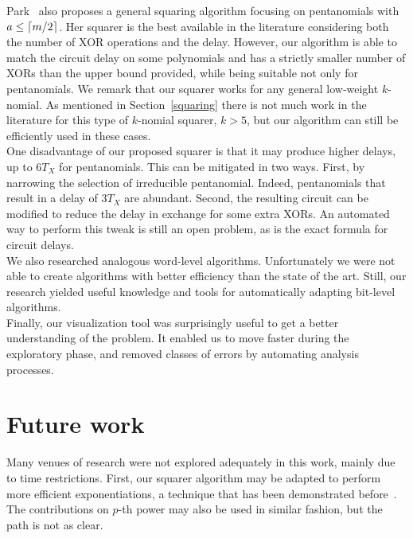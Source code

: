 Park~\cite{park2012explicit} also proposes a general squaring algorithm focusing on pentanomials with $a \leq \lceil m/2\rceil$. Her squarer is the best available in the literature considering both the number of XOR operations and the delay. However, our algorithm is able to match the circuit delay on some polynomials and has a strictly smaller number of XORs than the upper bound provided, while being suitable not only for pentanomials. 
We remark that our squarer works for any general low-weight $k$-nomial. As mentioned in Section~\ref{squaring} there is not much work in the literature for this type of $k$-nomial squarer, $k>5$, but our algorithm can still be efficiently used in these cases.\\

One disadvantage of our proposed squarer is that it may produce higher delays, up to $6 T_X$ for pentanomials. This can be mitigated in two ways. First, by narrowing the selection of irreducible pentanomial. Indeed,  pentanomials that result in a delay of $3 T_X$ are abundant. Second, the resulting circuit can be modified to reduce the delay in exchange for some extra XORs. An automated way to perform this tweak is still an open problem, as is the exact formula for circuit delays.\\

We also researched analogous word-level algorithms. Unfortunately we were not able to create algorithms with better efficiency than the state of the art. Still, our research yielded useful knowledge and tools for automatically adapting bit-level algorithms. \\

Finally, our visualization tool was surprisingly useful to get a better understanding of the problem. It enabled us to move faster during the exploratory phase, and removed classes of errors by automating analysis processes. \\


\section{Future work}

Many venues of research were not explored adequately in this work, mainly due to time restrictions. First, our squarer algorithm may be adapted to perform more efficient exponentiations, a technique that has been demonstrated before~\cite{park2012explicit}. The contributions on $p$-th power may also be used in similar fashion, but the path is not as clear. \\

